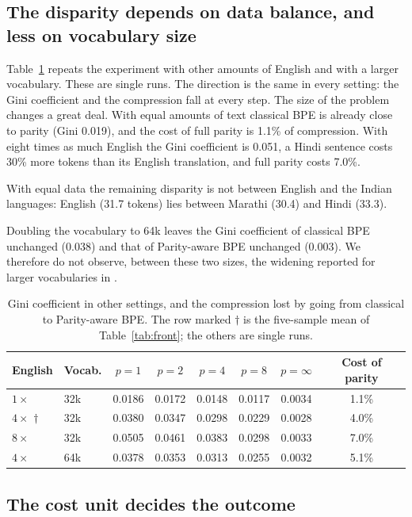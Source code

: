 \documentclass[11pt,a4paper]{article}
\theoremstyle{remark}
\begin{document}
\subsection{The disparity depends on data balance, and less on vocabulary size}

Table~\ref{tab:sens} repeats the experiment with other amounts of English and with a larger
vocabulary. These are single runs. The direction is the same in every setting: the Gini
coefficient and the compression fall at every step. The size of the problem changes a great
deal. With equal amounts of text classical BPE is already close to parity (Gini 0.019), and
the cost of full parity is 1.1\% of compression. With eight times as much English the Gini
coefficient is 0.051, a Hindi sentence costs 30\% more tokens than its English translation,
and full parity costs 7.0\%.

With equal data the remaining disparity is not between English and the Indian languages:
English (31.7 tokens) lies between Marathi (30.4) and Hindi (33.3).

Doubling the vocabulary to 64k leaves the Gini coefficient of classical BPE unchanged
(0.038) and that of Parity-aware BPE unchanged (0.003). We therefore do not observe, between
these two sizes, the widening reported for larger vocabularies in \cite{lee2026}.

\begin{table}[t]
\centering
\caption{Gini coefficient in other settings, and the compression lost by going from
classical to Parity-aware BPE. The row marked $\dagger$ is the five-sample mean of
Table~\ref{tab:front}; the others are single runs.}
\label{tab:sens}
\begin{tabular}{llcccccc}
\toprule
English & Vocab. & $p=1$ & $p=2$ & $p=4$ & $p=8$ & $p=\infty$ & Cost of parity\\
\midrule
$1\times$ & 32k & 0.0186 & 0.0172 & 0.0148 & 0.0117 & 0.0034 & 1.1\%\\
$4\times$ $\dagger$ & 32k & 0.0380 & 0.0347 & 0.0298 & 0.0229 & 0.0028 & 4.0\%\\
$8\times$ & 32k & 0.0505 & 0.0461 & 0.0383 & 0.0298 & 0.0033 & 7.0\%\\
$4\times$ & 64k & 0.0378 & 0.0353 & 0.0313 & 0.0255 & 0.0032 & 5.1\%\\
\bottomrule
\end{tabular}
\end{table}

\subsection{The cost unit decides the outcome}\label{sec:unitresult}
\end{document}
